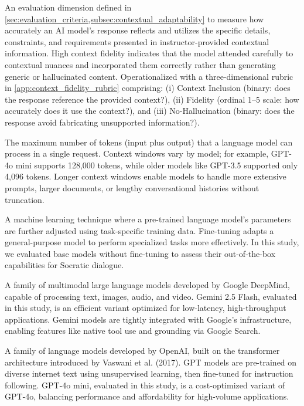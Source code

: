 \begin{description}[style=nextline,leftmargin=0em,itemsep=1em]
\item[\textbf{Context Fidelity}] An evaluation dimension defined in \cref{sec:evaluation_criteria,subsec:contextual_adaptability} to measure how accurately an AI model's response reflects and utilizes the specific details, constraints, and requirements presented in instructor-provided contextual information. High context fidelity indicates that the model attended carefully to contextual nuances and incorporated them correctly rather than generating generic or hallucinated content. Operationalized with a three-dimensional rubric in \cref{app:context_fidelity_rubric} comprising: (i) Context Inclusion (binary: does the response reference the provided context?), (ii) Fidelity (ordinal 1--5 scale: how accurately does it use the context?), and (iii) No-Hallucination (binary: does the response avoid fabricating unsupported information?).

\item[\textbf{Context Window}] The maximum number of tokens (input plus output) that a language model can process in a single request. Context windows vary by model; for example, GPT-4o mini supports 128,000 tokens, while older models like GPT-3.5 supported only 4,096 tokens. Longer context windows enable models to handle more extensive prompts, larger documents, or lengthy conversational histories without truncation.

\item[\textbf{Fine-Tuning}] A machine learning technique where a pre-trained language model's parameters are further adjusted using task-specific training data. Fine-tuning adapts a general-purpose model to perform specialized tasks more effectively. In this study, we evaluated base models without fine-tuning to assess their out-of-the-box capabilities for Socratic dialogue.

\item[\textbf{Gemini}] A family of multimodal large language models developed by Google DeepMind, capable of processing text, images, audio, and video. Gemini 2.5 Flash, evaluated in this study, is an efficient variant optimized for low-latency, high-throughput applications. Gemini models are tightly integrated with Google's infrastructure, enabling features like native tool use and grounding via Google Search.

\item[\textbf{GPT (Generative Pre-trained Transformer)}] A family of language models developed by OpenAI, built on the transformer architecture introduced by Vaswani et al. (2017). GPT models are pre-trained on diverse internet text using unsupervised learning, then fine-tuned for instruction following. GPT-4o mini, evaluated in this study, is a cost-optimized variant of GPT-4o, balancing performance and affordability for high-volume applications.


\end{description}

